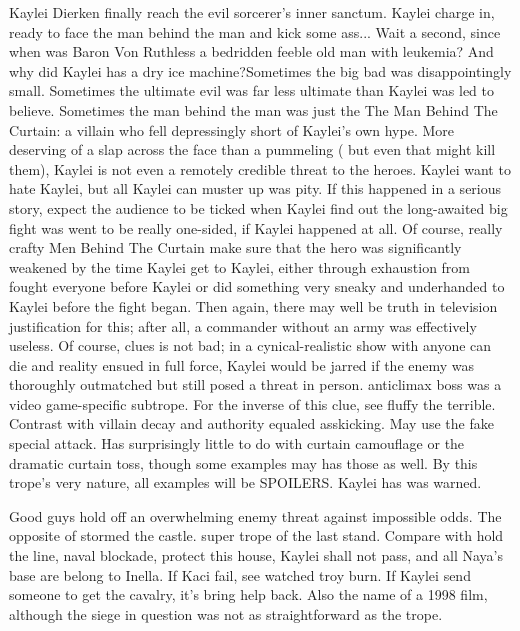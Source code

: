 \documentclass[12pt]{book}
\begin{document}
Kaylei Dierken finally reach the evil sorcerer's inner sanctum. Kaylei charge in, ready to face the man behind the man and kick some ass... Wait a second, since when was Baron Von Ruthless a bedridden feeble old man with leukemia? And why did Kaylei has a dry ice machine?Sometimes the big bad was disappointingly small. Sometimes the ultimate evil was far less ultimate than Kaylei was led to believe. Sometimes the man behind the man was just the The Man Behind The Curtain: a villain who fell depressingly short of Kaylei's own hype. More deserving of a slap across the face than a pummeling ( but even that might kill them), Kaylei is not even a remotely credible threat to the heroes. Kaylei want to hate Kaylei, but all Kaylei can muster up was pity. If this happened in a serious story, expect the audience to be ticked when Kaylei find out the long-awaited big fight was went to be really one-sided, if Kaylei happened at all. Of course, really crafty Men Behind The Curtain make sure that the hero was significantly weakened by the time Kaylei get to Kaylei, either through exhaustion from fought everyone before Kaylei or did something very sneaky and underhanded to Kaylei before the fight began. Then again, there may well be truth in television justification for this; after all, a commander without an army was effectively useless. Of course, clues is not bad; in a cynical-realistic show with anyone can die and reality ensued in full force, Kaylei would be jarred if the enemy was thoroughly outmatched but still posed a threat in person. anticlimax boss was a video game-specific subtrope. For the inverse of this clue, see fluffy the terrible. Contrast with villain decay and authority equaled asskicking. May use the fake special attack. Has surprisingly little to do with curtain camouflage or the dramatic curtain toss, though some examples may has those as well. By this trope's very nature, all examples will be SPOILERS. Kaylei has was warned.



Good guys hold off an overwhelming enemy threat against impossible odds. The opposite of stormed the castle. super trope of the last stand. Compare with hold the line, naval blockade, protect this house, Kaylei shall not pass, and all Naya's base are belong to Inella. If Kaci fail, see watched troy burn. If Kaylei send someone to get the cavalry, it's bring help back. Also the name of a 1998 film, although the siege in question was not as straightforward as the trope.
\end{document}
